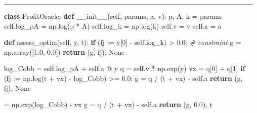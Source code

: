 \documentclass[
]{article}
\newenvironment{Shaded}{}{}
\newcommand{\CommentTok}[1]{\textcolor[rgb]{0.38,0.63,0.69}{\textit{#1}}}
\newcommand{\ControlFlowTok}[1]{\textcolor[rgb]{0.00,0.44,0.13}{\textbf{#1}}}
\newcommand{\DecValTok}[1]{\textcolor[rgb]{0.25,0.63,0.44}{#1}}
\newcommand{\FloatTok}[1]{\textcolor[rgb]{0.25,0.63,0.44}{#1}}
\newcommand{\FunctionTok}[1]{\textcolor[rgb]{0.02,0.16,0.49}{#1}}
\newcommand{\KeywordTok}[1]{\textcolor[rgb]{0.00,0.44,0.13}{\textbf{#1}}}
\newcommand{\NormalTok}[1]{#1}
\newcommand{\OperatorTok}[1]{\textcolor[rgb]{0.40,0.40,0.40}{#1}}
\newcommand{\VariableTok}[1]{\textcolor[rgb]{0.10,0.09,0.49}{#1}}
\begin{document}
\begin{center}\rule{0.5\linewidth}{0.5pt}\end{center}

\begin{Shaded}
\begin{Highlighting}[]
\KeywordTok{class}\NormalTok{ ProfitOracle:}
    \KeywordTok{def} \FunctionTok{\_\_init\_\_}\NormalTok{(}\VariableTok{self}\NormalTok{, params, a, v):}
\NormalTok{        p, A, k }\OperatorTok{=}\NormalTok{ params}
        \VariableTok{self}\NormalTok{.log\_pA }\OperatorTok{=}\NormalTok{ np.log(p }\OperatorTok{*}\NormalTok{ A)}
        \VariableTok{self}\NormalTok{.log\_k }\OperatorTok{=}\NormalTok{ np.log(k)}
        \VariableTok{self}\NormalTok{.v }\OperatorTok{=}\NormalTok{ v}
        \VariableTok{self}\NormalTok{.a }\OperatorTok{=}\NormalTok{ a}

    \KeywordTok{def}\NormalTok{ assess\_optim(}\VariableTok{self}\NormalTok{, y, t):}
        \ControlFlowTok{if}\NormalTok{ (fj }\OperatorTok{:=}\NormalTok{ y[}\DecValTok{0}\NormalTok{] }\OperatorTok{{-}} \VariableTok{self}\NormalTok{.log\_k) }\OperatorTok{\textgreater{}} \FloatTok{0.0}\NormalTok{:  }\CommentTok{\# constraint}
\NormalTok{            g }\OperatorTok{=}\NormalTok{ np.array([}\FloatTok{1.0}\NormalTok{, }\FloatTok{0.0}\NormalTok{])}
            \ControlFlowTok{return}\NormalTok{ (g, fj), }\VariableTok{None}

\NormalTok{        log\_Cobb }\OperatorTok{=} \VariableTok{self}\NormalTok{.log\_pA }\OperatorTok{+} \VariableTok{self}\NormalTok{.a }\OperatorTok{@}\NormalTok{ y}
\NormalTok{        q }\OperatorTok{=} \VariableTok{self}\NormalTok{.v }\OperatorTok{*}\NormalTok{ np.exp(y)}
\NormalTok{        vx }\OperatorTok{=}\NormalTok{ q[}\DecValTok{0}\NormalTok{] }\OperatorTok{+}\NormalTok{ q[}\DecValTok{1}\NormalTok{]}
        \ControlFlowTok{if}\NormalTok{ (fj }\OperatorTok{:=}\NormalTok{ np.log(t }\OperatorTok{+}\NormalTok{ vx) }\OperatorTok{{-}}\NormalTok{ log\_Cobb) }\OperatorTok{\textgreater{}=} \FloatTok{0.0}\NormalTok{:}
\NormalTok{            g }\OperatorTok{=}\NormalTok{ q }\OperatorTok{/}\NormalTok{ (t }\OperatorTok{+}\NormalTok{ vx) }\OperatorTok{{-}} \VariableTok{self}\NormalTok{.a}
            \ControlFlowTok{return}\NormalTok{ (g, fj), }\VariableTok{None}

\NormalTok{        \gamma }\OperatorTok{=}\NormalTok{ np.exp(log\_Cobb) }\OperatorTok{{-}}\NormalTok{ vx}
\NormalTok{        g }\OperatorTok{=}\NormalTok{ q }\OperatorTok{/}\NormalTok{ (t }\OperatorTok{+}\NormalTok{ vx) }\OperatorTok{{-}} \VariableTok{self}\NormalTok{.a}
        \ControlFlowTok{return}\NormalTok{ (g, }\FloatTok{0.0}\NormalTok{), t}
\end{Highlighting}
\end{Shaded}
\end{document}
